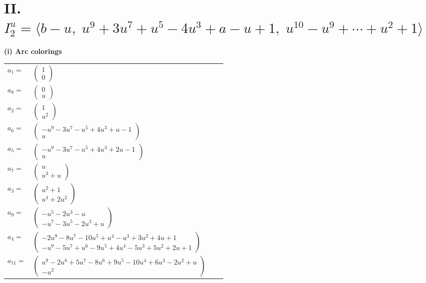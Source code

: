 \documentclass[1p]{elsarticle_modified}
\theoremstyle{definition}
\begin{document}
\centering \section*{II. $I^u_{2}= \langle b- u,\;u^9+3 u^7+u^5-4 u^3+a- u+1,\;u^{10}- u^9+\cdots+u^2+1 \rangle$}
\flushleft \textbf{(i) Arc colorings}\\
\begin{tabular}{m{7pt} m{180pt} m{7pt} m{180pt} }
\flushright $a_{1}=$&$\begin{pmatrix}1\\0\end{pmatrix}$ \\
\flushright $a_{8}=$&$\begin{pmatrix}0\\u\end{pmatrix}$ \\
\flushright $a_{2}=$&$\begin{pmatrix}1\\u^2\end{pmatrix}$ \\
\flushright $a_{6}=$&$\begin{pmatrix}- u^9-3 u^7- u^5+4 u^3+u-1\\u\end{pmatrix}$ \\
\flushright $a_{5}=$&$\begin{pmatrix}- u^9-3 u^7- u^5+4 u^3+2 u-1\\u\end{pmatrix}$ \\
\flushright $a_{7}=$&$\begin{pmatrix}u\\u^3+u\end{pmatrix}$ \\
\flushright $a_{3}=$&$\begin{pmatrix}u^2+1\\u^4+2 u^2\end{pmatrix}$ \\
\flushright $a_{9}=$&$\begin{pmatrix}- u^5-2 u^3- u\\- u^7-3 u^5-2 u^3+u\end{pmatrix}$ \\
\flushright $a_{4}=$&$\begin{pmatrix}-2 u^9-8 u^7-10 u^5+u^4- u^3+3 u^2+4 u+1\\- u^9-5 u^7+u^6-9 u^5+4 u^4-5 u^3+5 u^2+2 u+1\end{pmatrix}$ \\
\flushright $a_{11}=$&$\begin{pmatrix}u^9-2 u^8+5 u^7-8 u^6+9 u^5-10 u^4+6 u^3-2 u^2+u\\- u^2\end{pmatrix}$ \\

\end{tabular}
\end{document}

